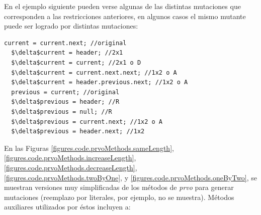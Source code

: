 En el ejemplo siguiente pueden verse algunas de las distintas mutaciones que corresponden a las restricciones anteriores, en algunos casos el mismo mutante puede ser logrado por distintas mutaciones:
\begin{lstlisting}[mathescape=true]
  current = current.next; //original
  $\delta$current = header; //2x1
  $\delta$current = current; //2x1 o D 
  $\delta$current = current.next.next; //1x2 o A
  $\delta$current = header.previous.next; //1x2 o A
  previous = current; //original
  $\delta$previous = header; //R
  $\delta$previous = null; //R
  $\delta$previous = current.next; //1x2 o A
  $\delta$previous = header.next; //1x2
\end{lstlisting}

En las Figuras \ref{figures.code.prvoMethods.sameLength}, \ref{figures.code.prvoMethods.increaseLength}, \ref{figures.code.prvoMethods.decreaseLength}, \ref{figures.code.prvoMethods.twoByOne}, y \ref{figures.code.prvoMethods.oneByTwo}, se muestran versiones muy simplificadas de los m\'etodos de \emph{prvo} para generar mutaciones (reemplazo por literales, por ejemplo, no se muestra). M\'etodos auxiliares utilizados por \'estos incluyen a:

